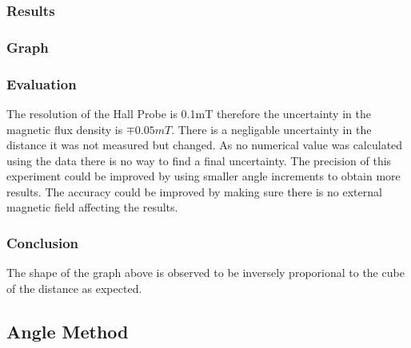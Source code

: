 \subsubsection{Results}
\begin{center}
\end{center}

\subsubsection{Graph}
\begin{figure}[H]
  \centering
\end{figure}

\subsubsection{Evaluation}
The resolution of the Hall Probe is 0.1mT therefore the uncertainty in the magnetic flux density is $\mp 0.05mT$.
There is a negligable uncertainty in the distance it was not measured but changed.
As no numerical value was calculated using the data there is no way to find a final uncertainty.
The precision of this experiment could be improved by using smaller angle increments to obtain more results.
The accuracy could be improved by making sure there is no external magnetic field affecting the results.

\subsubsection{Conclusion}
The shape of the graph above is observed to be inversely proporional to the cube of the distance as expected.\cite{mille:magnetic}

\subsection{Angle Method}

